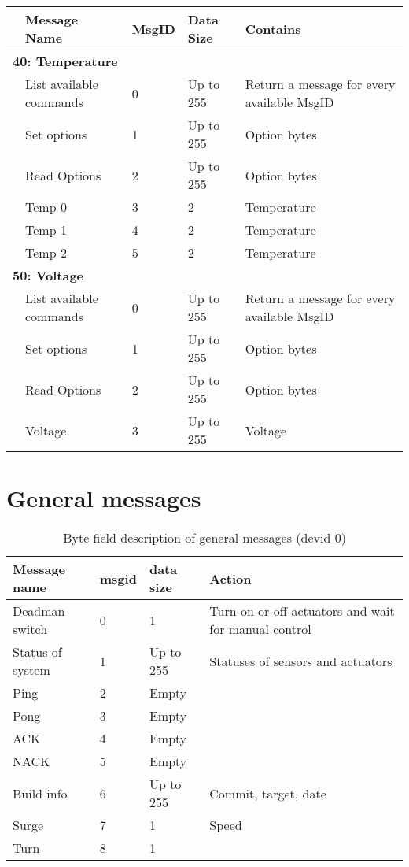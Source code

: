 \begin{table}[h!]
\centering
	\begin{tabular}{lllll}
	\toprule
	& \textbf{Message Name} & \textbf{MsgID} & \textbf{Data Size} & \textbf{Contains}\\
	\midrule
	\multicolumn{5}{l}{\textbf{40: Temperature}}\\
	\midrule
	& List available commands & 0 & Up to 255 & Return a message for every available MsgID\\
	& Set options & 1 & Up to 255 & Option bytes\\
	& Read Options & 2 & Up to 255 & Option bytes\\
	& Temp 0 & 3 & 2 & Temperature \\
	& Temp 1 & 4 & 2 & Temperature \\
	& Temp 2 & 5 & 2 & Temperature \\
	\midrule
	\multicolumn{5}{l}{\textbf{50: Voltage}}\\
	\midrule
	& List available commands & 0 & Up to 255 & Return a message for every available MsgID\\
	& Set options & 1 & Up to 255 & Option bytes\\
	& Read Options & 2 & Up to 255 & Option bytes\\
	& Voltage & 3 & Up to 255 & Voltage\\
	\bottomrule
	\end{tabular}
\end{table}

\section{General messages}

\begin{table}[h]
	\centering
	\begin{tabular}{llll}
		\toprule
		\textbf{Message name}  & \textbf{msgid} & \textbf{data size} & \textbf{Action}\\
		\midrule
		Deadman switch & 0 & 1 & Turn on or off actuators and wait for manual control \\
		Status of system & 1 & Up to 255 & Statuses of sensors and actuators \\
		Ping & 2 & Empty \\
		Pong & 3& Empty \\
		ACK & 4 & Empty\\
		NACK & 5 & Empty\\
		Build info & 6 & Up to 255 & Commit, target, date\\
		Surge & 7 & 1 & Speed\\
		Turn & 8 & 1 &\\
		\bottomrule
	\end{tabular}
	\caption{Byte field description of general messages (devid 0)}
	\label{tab:ack}
\end{table}


